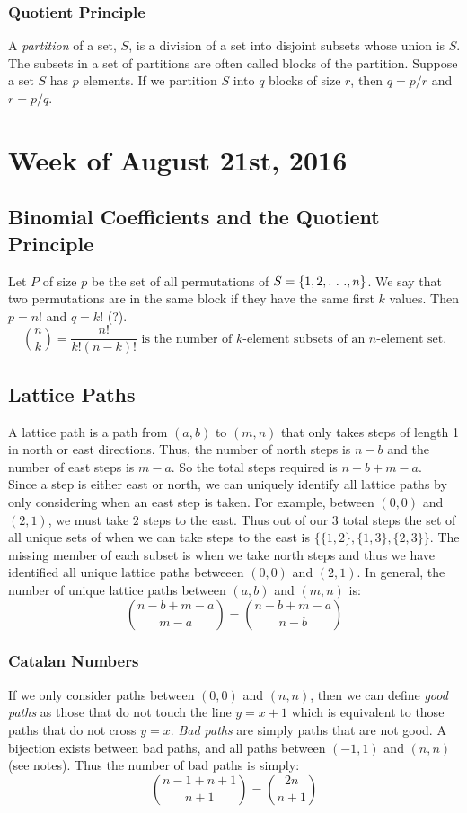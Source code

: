 \documentclass{article}
\begin{document}
\subsubsection{Quotient Principle}
A \textit{partition} of a set, $S$, is a division of a set into disjoint subsets whose union is $S$. The subsets in a set of partitions are often called blocks of the partition. \newline
\noindent Suppose a set $S$ has $p$ elements. If we partition $S$ into $q$ blocks of size $r$, then $q=p/r$ and $r=p/q$.

\section{Week of August 21st, 2016}
\subsection{Binomial Coefficients and the Quotient Principle}
Let $P$ of size $p$ be the set of all permutations of $S=\{1,2,.\ .\ .,n\}$. We say that two permutations are in the same block if they have the same first $k$ values. Then $p=n!$ and $q=k!$ (?).
$$\binom{n}{k}=\frac{n!}{k!(n-k)!} \text{ is the number of }k\text{-element subsets of an }n\text{-element set.}$$

\subsection{Lattice Paths}
A lattice path is a path from $(a,b)$ to $(m,n)$ that only takes steps of length 1 in north or east directions. Thus, the number of north steps is $n-b$ and the number of east steps is $m-a$. So the total steps required is $n-b+m-a$. \\

\noindent Since a step is either east or north, we can uniquely identify all lattice paths by only considering when an east step is taken. For example, between $(0,0)$ and $(2,1)$, we must take $2$ steps to the east. Thus out of our $3$ total steps the set of all unique sets of when we can take steps to the east is $\{\{1,2\},\{1,3\},\{2,3\}\}$. The missing member of each subset is when we take north steps and thus we have identified all unique lattice paths betweeen $(0,0)$ and $(2,1)$. In general, the number of unique lattice paths between $(a,b)$ and $(m,n)$ is:
$$\binom{n-b+m-a}{m-a}=\binom{n-b+m-a}{n-b}$$

\subsubsection{Catalan Numbers}
If we only consider paths between $(0,0)$ and $(n,n)$, then we can define \textit{good paths} as those that do not touch the line $y=x+1$ which is equivalent to those paths that do not cross $y=x$. \textit{Bad paths} are simply paths that are not good. A bijection exists between bad paths, and all paths between $(-1,1)$ and $(n,n)$ (see notes). Thus the number of bad paths is simply:
$$\binom{n-1+n+1}{n+1}=\binom{2n}{n+1}$$
\end{document}
